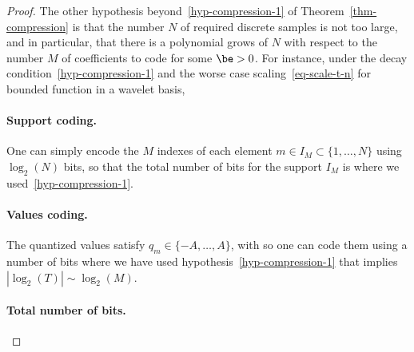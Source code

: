 \begin{proof}
The other hypothesis beyond~\eqref{hyp-compression-1} of Theorem~\ref{thm-compression} is that the number $N$ of required discrete samples is not too large, and in particular, that there is a polynomial grows of $N$ with respect to the number $M$ of coefficients to code
for some $\be > 0$. 
%
For instance, under the decay condition~\eqref{hyp-compression-1} and the worse case scaling~\eqref{eq-scale-t-n} for bounded function in a wavelet basis, 



\paragraph{Support coding.}

One can simply encode the $M$ indexes of each element $m \in I_M \subset \{1,\ldots,N\}$ using $\log_2(N)$ bits, so that the total number of bits for the support $I_M$ is
where we used~\eqref{hyp-compression-1}. 

\paragraph{Values coding.}

The quantized values satisfy $q_m \in \{-A,\ldots,A\}$, with 
so one can code them using a number of bits 
where we have used hypothesis~\eqref{hyp-compression-1} that implies $|\log_2(T)| \sim \log_2(M)$.

\paragraph{Total number of bits.}


\end{proof}
